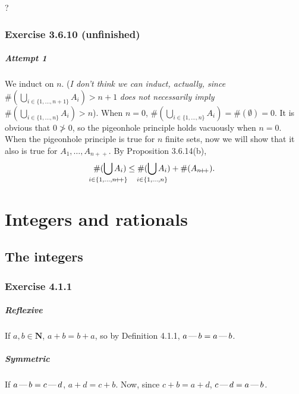 \documentclass[12pt, oneside]{book}
\newcommand{\increment}{\! + \! +}
\newcommand{\formalminus}{\, \text{\textemdash} \,}
\begin{document}
	?

	\subsection*{Exercise 3.6.10 (unfinished)}

	\paragraph*{Attempt 1}

	We induct on $n$. (\emph{I don't think we can induct, actually, since} $\#(\bigcup_{i \in \{1, \dotsc, n + 1\}} A_i) > n + 1$ \emph{does not necessarily imply} $\#(\bigcup_{i \in \{1, \dotsc, n\}} A_i) > n$). When $n = 0$, $\#(\bigcup_{i \in \{1, \dotsc, n\}} A_i) = \#(\emptyset) = 0$. It is obvious that $0 \not > 0$, so the pigeonhole principle holds vacuously when $n = 0$. When the pigeonhole principle is true for $n$ finite sets, now we will show that it also is true for $A_1, \dotsc, A_{n \increment}$. By Proposition 3.6.14(b), \[\#(\smashoperator{\bigcup_{i \in \{1, \dotsc, n \increment\}}} A_i) \le \#(\smashoperator{\bigcup_{i \in \{1, \dotsc, n\}}} A_i) + \#(A_{n \increment}).\]

	\chapter{Integers and rationals}

	\section{The integers}

	\subsection*{Exercise 4.1.1}

	\paragraph*{Reflexive}

	If $a, b \in \mathbf{N}$, $a + b = b + a$, so by Definition 4.1.1, $a \formalminus b = a \formalminus b$.

	\paragraph*{Symmetric}

	If $a \formalminus b = c \formalminus d$, $a + d = c + b$. Now, since $c + b = a + d$, $c \formalminus d = a \formalminus b$.
\end{document}
